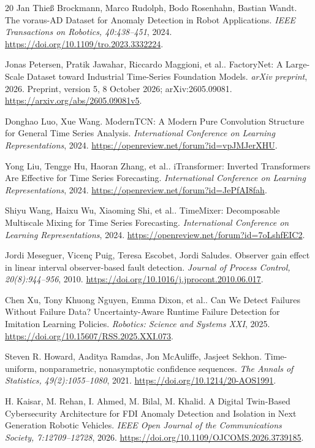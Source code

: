 \begin{thebibliography}{20}
 Jan Thieß Brockmann, Marco Rudolph, Bodo Rosenhahn, Bastian Wandt. {The voraus-AD Dataset for Anomaly Detection in Robot Applications}. \emph{IEEE Transactions on Robotics, 40:438--451}, 2024. \url{https://doi.org/10.1109/tro.2023.3332224}.

 Jonas Petersen, Pratik Jawahar, Riccardo Maggioni, et al.. {FactoryNet: A Large-Scale Dataset toward Industrial Time-Series Foundation Models}. \emph{arXiv preprint}, 2026. Preprint, version 5, 8 October 2026; arXiv:2605.09081. \url{https://arxiv.org/abs/2605.09081v5}.

 Donghao Luo, Xue Wang. {ModernTCN: A Modern Pure Convolution Structure for General Time Series Analysis}. \emph{International Conference on Learning Representations}, 2024. \url{https://openreview.net/forum?id=vpJMJerXHU}.

 Yong Liu, Tengge Hu, Haoran Zhang, et al.. {iTransformer: Inverted Transformers Are Effective for Time Series Forecasting}. \emph{International Conference on Learning Representations}, 2024. \url{https://openreview.net/forum?id=JePfAI8fah}.

 Shiyu Wang, Haixu Wu, Xiaoming Shi, et al.. {TimeMixer: Decomposable Multiscale Mixing for Time Series Forecasting}. \emph{International Conference on Learning Representations}, 2024. \url{https://openreview.net/forum?id=7oLshfEIC2}.

 Jordi Meseguer, Vicen{\c c} Puig, Teresa Escobet, Jordi Saludes. {Observer gain effect in linear interval observer-based fault detection}. \emph{Journal of Process Control, 20(8):944--956}, 2010. \url{https://doi.org/10.1016/j.jprocont.2010.06.017}.

 Chen Xu, Tony Khuong Nguyen, Emma Dixon, et al.. {Can We Detect Failures Without Failure Data? Uncertainty-Aware Runtime Failure Detection for Imitation Learning Policies}. \emph{Robotics: Science and Systems XXI}, 2025. \url{https://doi.org/10.15607/RSS.2025.XXI.073}.

 Steven R. Howard, Aaditya Ramdas, Jon McAuliffe, Jasjeet Sekhon. {Time-uniform, nonparametric, nonasymptotic confidence sequences}. \emph{The Annals of Statistics, 49(2):1055--1080}, 2021. \url{https://doi.org/10.1214/20-AOS1991}.

 H. Kaisar, M. Rehan, I. Ahmed, M. Bilal, M. Khalid. {A Digital Twin-Based Cybersecurity Architecture for FDI Anomaly Detection and Isolation in Next Generation Robotic Vehicles}. \emph{IEEE Open Journal of the Communications Society, 7:12709--12728}, 2026. \url{https://doi.org/10.1109/OJCOMS.2026.3739185}.


\end{thebibliography}

